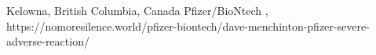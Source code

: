           {Kelowna, British Columbia, Canada}
          {}
          {Pfizer/BioNtech}
          {, }
          {
            }
          {https://nomoresilence.world/pfizer-biontech/dave-menchinton-pfizer-severe-adverse-reaction/}

